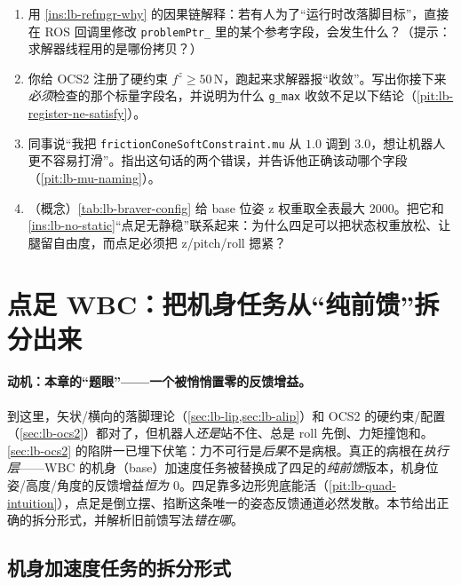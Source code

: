 \begin{practice}
\begin{enumerate}
  \item 用 \cref{ins:lb-refmgr-why} 的因果链解释：若有人为了“运行时改落脚目标”，直接在 ROS 回调里修改 \texttt{problemPtr\_} 里的某个参考字段，会发生什么？（提示：求解器线程用的是哪份拷贝？）
  \item 你给 OCS2 注册了硬约束 $f^z\ge 50\,\mathrm{N}$，跑起来求解器报“收敛”。写出你接下来\emph{必须}检查的那个标量字段名，并说明为什么 \texttt{g\_max} 收敛不足以下结论（\cref{pit:lb-register-ne-satisfy}）。
  \item 同事说“我把 \texttt{frictionConeSoftConstraint.mu} 从 $1.0$ 调到 $3.0$，想让机器人更不容易打滑”。指出这句话的两个错误，并告诉他正确该动哪个字段（\cref{pit:lb-mu-naming}）。
  \item （概念）\cref{tab:lb-braver-config} 给 base 位姿 z 权重取全表最大 $2000$。把它和 \cref{ins:lb-no-static}“点足无静稳”联系起来：为什么四足可以把状态权重放松、让腿留自由度，而点足必须把 z/pitch/roll 摁紧？
\end{enumerate}
\end{practice}

\section{点足 WBC：把机身任务从“纯前馈”拆分出来}
\label{sec:lb-wbc}

\paragraph{动机：本章的“题眼”——一个被悄悄置零的反馈增益。}
到这里，矢状/横向的落脚理论（\cref{sec:lb-lip,sec:lb-alip}）和 OCS2 的硬约束/配置（\cref{sec:lb-ocs2}）都对了，但机器人\emph{还是}站不住、总是 roll 先倒、力矩撞饱和。\cref{sec:lb-ocs2} 的陷阱一已埋下伏笔：力不可行是\emph{后果}不是病根。真正的病根在\emph{执行层}——WBC 的机身（base）加速度任务被替换成了四足的\emph{纯前馈}版本，机身位姿/高度/角度的反馈增益\emph{恒为 $0$}。四足靠多边形兜底能活（\cref{pit:lb-quad-intuition}），点足是倒立摆、掐断这条唯一的姿态反馈通道必然发散。本节给出正确的拆分形式，并解析旧前馈写法\emph{错在哪}。

\subsection{机身加速度任务的拆分形式}
\label{subsec:lb-base-split}


